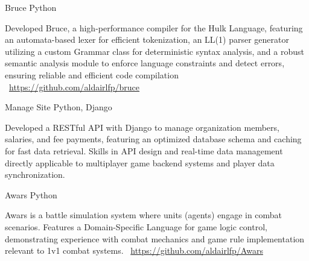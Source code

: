 \documentclass[]{awesome-cv}
\begin{document}
\begin{cventries}
	\vspace{-3mm}
	\cventry
	{}
	{Bruce \vspace{-5mm}}
	{Python \vspace{-5mm}}
	{}
	{\begin{cvsectionnormaltext}
			\item {Developed Bruce, a high-performance compiler for the Hulk Language, featuring an automata-based lexer for efficient
			            tokenization, an LL(1) parser generator utilizing a custom Grammar class for deterministic syntax analysis, and a robust
			            semantic analysis module to enforce language constraints and detect errors, ensuring reliable and efficient code
			            compilation
			            \newline \faLink\ \href{https://github.com/aldairlfp/bruce}{https://github.com/aldairlfp/bruce}}
		\end{cvsectionnormaltext}}

	\vspace{-3mm}
	\cventry
	{}
	{Manage Site \vspace{-5mm}}
	{Python, Django \vspace{-5mm}}
	{}
	{\begin{cvsectionnormaltext}
			\item{Developed a RESTful API with Django to manage organization members, salaries, and fee payments, featuring an
			            optimized database schema and caching for fast data retrieval. Skills in API design and real-time data management
			            directly applicable to multiplayer game backend systems and player data synchronization.}
		\end{cvsectionnormaltext}}

	\vspace{-3mm}
	\cventry
	{}
	{Awars \vspace{-5mm}}
	{Python \vspace{-5mm}}
	{}
	{\begin{cvsectionnormaltext}
			\item{Awars is a battle simulation system where units (agents) engage in combat scenarios. Features a Domain-Specific Language
			            for game logic control, demonstrating experience with combat mechanics and game rule implementation relevant to 1v1 combat systems.
			            \newline \faLink\ \href{https://github.com/aldairlfp/Awars}{https://github.com/aldairlfp/Awars}}
		\end{cvsectionnormaltext}}


\end{cventries}
\end{document}

